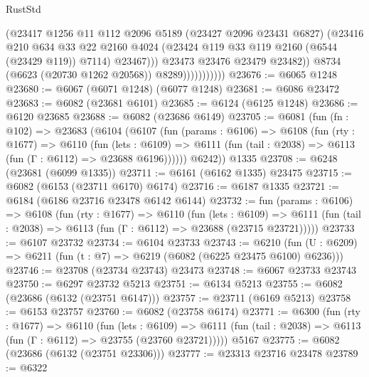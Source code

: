 \begin{lexlean}{RustStd}
\begin{coremodule}
                                (@23417
                                  @1256
                                  @11
                                  @112
                                  @2096
                                  @5189
                                  (@23427 @2096 @23431 @6827)
                                  (@23416
                                    @210
                                    @634
                                    @33
                                    @22
                                    @2160
                                    @4024
                                    (@23424 @119 @33 @119 @2160 (@6544 (@23429 @119)) @7114)
                                    @23467)))
                              @23473
                              @23476
                              @23479
                              @23482))
                          @8734
                          (@6623 (@20730 @1262 @20568))
                          @8289)))))))))))
@23676 := @6065 @1248
@23680 := @6067 (@6071 @1248) (@6077 @1248)
@23681 := @6086 @23472
@23683 := @6082 (@23681 @6101)
@23685 := @6124 (@6125 @1248)
@23686 := @6120 @23685
@23688 := @6082 (@23686 @6149)
@23705 := @6081
    (fun (fn : @102) =>
    @23683
      (@6104
        (@6107
          (fun (params : @6106) =>
          @6108
            (fun (rty : @1677) =>
            @6110
              (fun (lets : @6109) =>
              @6111 (fun (tail : @2038) => @6113 (fun (Γ : @6112) => @23688 @6196))))))
        @6242))
    @1335
@23708 := @6248 (@23681 (@6099 @1335))
@23711 := @6161 (@6162 @1335) @23475
@23715 := @6082 (@6153 (@23711 @6170) @6174)
@23716 := @6187 @1335
@23721 := @6184 (@6186 @23716 @23478 @6142 @6144)
@23732 := fun (params : @6106) =>
  @6108
    (fun (rty : @1677) =>
    @6110
      (fun (lets : @6109) =>
      @6111 (fun (tail : @2038) => @6113 (fun (Γ : @6112) => @23688 (@23715 @23721)))))
@23733 := @6107 @23732
@23734 := @6104 @23733
@23743 := @6210
    (fun (U : @6209) => @6211 (fun (t : @7) => @6219 (@6082 (@6225 @23475 @6100) @6236)))
@23746 := @23708 (@23734 @23743) @23473
@23748 := @6067 @23733 @23743
@23750 := @6297 @23732 @5213
@23751 := @6134 @5213
@23755 := @6082 (@23686 (@6132 (@23751 @6147)))
@23757 := @23711 (@6169 @5213)
@23758 := @6153 @23757
@23760 := @6082 (@23758 @6174)
@23771 := @6300
    (fun (rty : @1677) =>
    @6110
      (fun (lets : @6109) =>
      @6111 (fun (tail : @2038) => @6113 (fun (Γ : @6112) => @23755 (@23760 @23721)))))
    @5167
@23775 := @6082 (@23686 (@6132 (@23751 @23306)))
@23777 := @23313 @23716 @23478
@23789 := @6322

\end{coremodule}
\end{lexlean}
